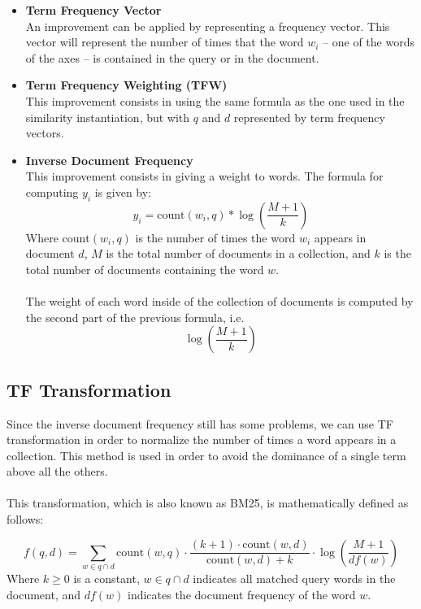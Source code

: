 \documentclass{article}
\begin{document}
\begin{itemize}	
	\item \textbf{Term Frequency Vector}
	\vspace{.2cm} \\
	An improvement can be applied by representing a frequency vector. This vector will represent the number of times that the word $w_i$ -- one of the words of the axes -- is contained in the query or in the document.
	
	\item \textbf{Term Frequency Weighting (TFW)}
	\vspace{.2cm} \\
	This improvement consists in using the same formula as the one used in the similarity instantiation, but with $q$ and $d$ represented by term frequency vectors.
	
	\item \textbf{Inverse Document Frequency}
	\vspace{.2cm} \\
	This improvement consists in giving a weight to words. The formula for computing $y_i$ is given by:
	\[ y_i = \text{count}(w_i, q) * \log \left( \frac{M+1}{k} \right) \]
	Where $\text{count}(w_i, q)$ is the number of times the word $w_i$ appears in document $d$, $M$ is the total number of documents in a collection, and $k$ is the total number of documents containing the word $w$. \\ \\
	The weight of each word inside of the collection of documents is computed by the second part of the previous formula, i.e.
	\[ \log \left( \frac{M+1}{k} \right) \]
\end{itemize}

\subsection{TF Transformation}
Since the inverse document frequency still has some problems, we can use TF transformation in order to normalize the number of times a word appears in a collection. This method is used in order to avoid the dominance of a single term above all the others. \\ \\
This transformation, which is also known as BM25, is mathematically defined as follows:

\[ f(q, d) = \sum_{w \in q \cap d} \text{count}(w, q) \cdot \frac{(k+1) \cdot \text{count}(w, d)}{\text{count}(w, d) + k} \cdot \log \left( \frac{M+1}{df(w)} \right) \]
Where $k \geq 0$ is a constant, $w \in q \cap d$ indicates all matched query words in the document, and $df(w)$ indicates the document frequency of the word $w$.
\end{document}
